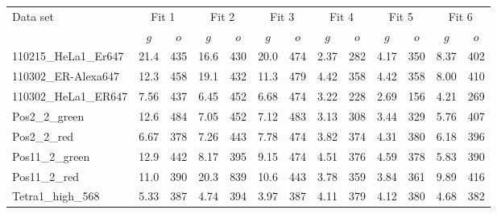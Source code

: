 \begin{footnotesize}
\begin{center}
\label{tablefits}%
\begin{tabular}{l||c|c||c|c||c|c||c|c||c|c||c|c||}
Data set&\multicolumn{2}{c||}{Fit 1}&\multicolumn{2}{c||}{Fit 2}&\multicolumn{2}{c||}{Fit 3}&\multicolumn{2}{c||}{Fit 4}&\multicolumn{2}{c||}{Fit 5}&\multicolumn{2}{c||}{Fit 6}\\
&$g$&$o$&$g$&$o$&$g$&$o$&$g$&$o$&$g$&$o$&$g$&$o$\\\hline
110215\_HeLa1\_Er647&21.4&435&16.6&430&20.0&474&2.37&282&4.17&350&8.37&402\\\hline
110302\_ER-Alexa647&12.3&458&19.1&432&11.3&479&4.42&358&4.42&358&8.00&410\\\hline
110302\_HeLa1\_ER647&7.56&437&6.45&452&6.68&474&3.22&228&2.69&156&4.21&269\\\hline
Pos2\_2\_green&12.6&484&7.05&452&7.12&483&3.13&308&3.44&329&5.76&407\\\hline
Pos2\_2\_red&6.67&378&7.26&443&7.78&474&3.82&374&4.31&380&6.18&396\\\hline
Pos11\_2\_green&12.9&442&8.17&395&9.15&474&4.51&376&4.59&378&5.83&390\\\hline
Pos11\_2\_red&11.0&390&20.3&839&10.6&443&3.78&359&3.84&361&9.89&416\\\hline
Tetra1\_high\_568&5.33&387&4.74&394&3.97&387&4.11&379&4.12&380&4.68&382
\end{tabular} 

\end{center}
\end{footnotesize}
 
